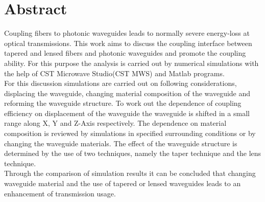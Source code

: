 \chapter*{Abstract}
\label{cha:kurzfassung}
Coupling fibers to photonic waveguides leads to normally severe energy-loss at optical transmissions. This work aims to discuss the coupling interface between tapered and lensed fibers and photonic waveguides and promote the coupling ability. For this purpose the analysis is carried out by numerical simulations with the help of CST Microwave Studio\textregistered\hspace{0.1cm}(CST MWS) and Matlab programs. \\

For this discussion simulations are carried out on following considerations, displacing the waveguide, changing material composition of the waveguide and reforming the waveguide structure. To work out the dependence of coupling efficiency on displacement of the waveguide the waveguide is shifted in a small range along X, Y and Z-Axis respectively. The dependence on material composition is reviewed by simulations in specified surrounding conditions or by changing the waveguide materials. The effect of the waveguide structure is determined by the use of two techniques, namely the taper technique and the lens technique. \\

Through the comparison of simulation results it can be concluded that changing waveguide material and the use of tapered or lensed waveguides leads to an enhancement of transmission usage.
